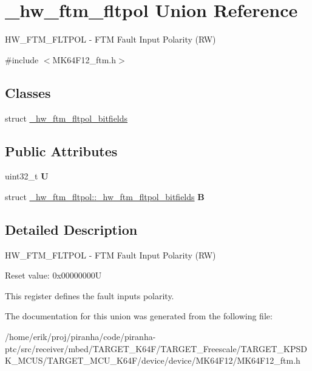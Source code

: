 \hypertarget{union__hw__ftm__fltpol}{}\section{\+\_\+hw\+\_\+ftm\+\_\+fltpol Union Reference}
\label{union__hw__ftm__fltpol}


H\+W\+\_\+\+F\+T\+M\+\_\+\+F\+L\+T\+P\+OL -\/ F\+TM Fault Input Polarity (RW)  




{\ttfamily \#include $<$M\+K64\+F12\+\_\+ftm.\+h$>$}

\subsection*{Classes}
\begin{DoxyCompactItemize}
\item 
struct \hyperlink{struct__hw__ftm__fltpol_1_1__hw__ftm__fltpol__bitfields}{\+\_\+hw\+\_\+ftm\+\_\+fltpol\+\_\+bitfields}
\end{DoxyCompactItemize}
\subsection*{Public Attributes}
\begin{DoxyCompactItemize}
\item 
uint32\+\_\+t {\bfseries U}\hypertarget{union__hw__ftm__fltpol_aaf83ef6fd8dca07c0137a8e820f66ba4}{}\label{union__hw__ftm__fltpol_aaf83ef6fd8dca07c0137a8e820f66ba4}

\item 
struct \hyperlink{struct__hw__ftm__fltpol_1_1__hw__ftm__fltpol__bitfields}{\+\_\+hw\+\_\+ftm\+\_\+fltpol\+::\+\_\+hw\+\_\+ftm\+\_\+fltpol\+\_\+bitfields} {\bfseries B}\hypertarget{union__hw__ftm__fltpol_a893646aa3c680787f374ce4d957e8692}{}\label{union__hw__ftm__fltpol_a893646aa3c680787f374ce4d957e8692}

\end{DoxyCompactItemize}


\subsection{Detailed Description}
H\+W\+\_\+\+F\+T\+M\+\_\+\+F\+L\+T\+P\+OL -\/ F\+TM Fault Input Polarity (RW) 

Reset value\+: 0x00000000U

This register defines the fault inputs polarity. 

The documentation for this union was generated from the following file\+:\begin{DoxyCompactItemize}
\item 
/home/erik/proj/piranha/code/piranha-\/ptc/src/receiver/mbed/\+T\+A\+R\+G\+E\+T\+\_\+\+K64\+F/\+T\+A\+R\+G\+E\+T\+\_\+\+Freescale/\+T\+A\+R\+G\+E\+T\+\_\+\+K\+P\+S\+D\+K\+\_\+\+M\+C\+U\+S/\+T\+A\+R\+G\+E\+T\+\_\+\+M\+C\+U\+\_\+\+K64\+F/device/device/\+M\+K64\+F12/M\+K64\+F12\+\_\+ftm.\+h\end{DoxyCompactItemize}
